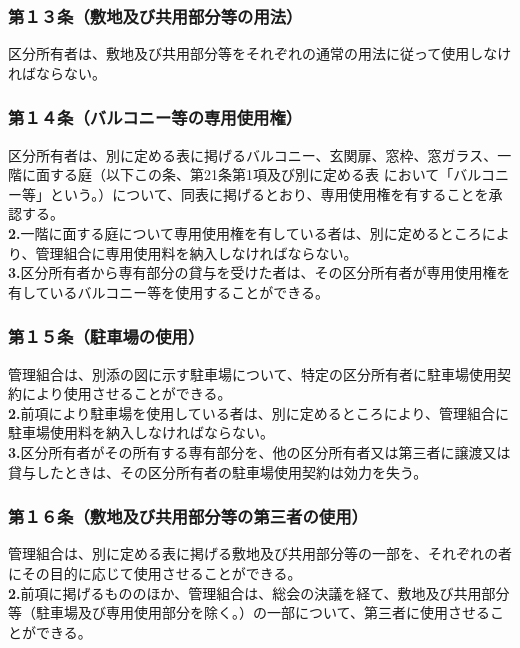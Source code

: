 \documentclass[12pt,uplatex]{jsarticle}
\begin{document}
\subsubsection*{第１３条（敷地及び共用部分等の用法）}
区分所有者は、敷地及び共用部分等をそれぞれの通常の用法に従って使用しなければならない。
\subsubsection*{第１４条（バルコニー等の専用使用権）}
区分所有者は、別に定める表に掲げるバルコニー、玄関扉、窓枠、窓ガラス、一階に面する庭（以下この条、第21条第1項及び別に定める表
において「バルコニー等」という。）について、同表に掲げるとおり、専用使用権を有することを承認する。\\
\textbf{2.}一階に面する庭について専用使用権を有している者は、別に定めるところにより、管理組合に専用使用料を納入しなければならない。\\
\textbf{3.}区分所有者から専有部分の貸与を受けた者は、その区分所有者が専用使用権を有しているバルコニー等を使用することができる。
\subsubsection*{第１５条（駐車場の使用）}
管理組合は、別添の図に示す駐車場について、特定の区分所有者に駐車場使用契約により使用させることができる。\\
\textbf{2.}前項により駐車場を使用している者は、別に定めるところにより、管理組合に駐車場使用料を納入しなければならない。\\
\textbf{3.}区分所有者がその所有する専有部分を、他の区分所有者又は第三者に譲渡又は貸与したときは、その区分所有者の駐車場使用契約は効力を失う。
\subsubsection*{第１６条（敷地及び共用部分等の第三者の使用）}
管理組合は、別に定める表に掲げる敷地及び共用部分等の一部を、それぞれの者にその目的に応じて使用させることができる。\\
\textbf{2.}前項に掲げるもののほか、管理組合は、総会の決議を経て、敷地及び共用部分等（駐車場及び専用使用部分を除く。）の一部について、第三者に使用させることができる。
\end{document}

